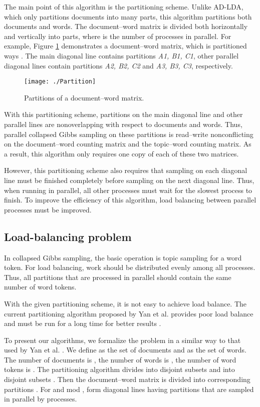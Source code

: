 \documentclass[10pt,conference]{IEEEtran}
\begin{document}
The main point of this algorithm is the partitioning scheme. Unlike AD-LDA, which only partitions documents into many parts, this algorithm partitions both documents and words. The document--word matrix is divided both horizontally and vertically into  parts, where  is the number of processes in parallel. For example, Figure \ref{fig:Partition} demonstrates a document--word matrix, which is partitioned  ways \cite{ihler2012understanding}. The main diagonal line contains partitions \textit{A1, B1, C1}, other parallel diagonal lines contain partitions \textit{A2, B2, C2} and \textit{A3, B3, C3}, respectively.
\begin{figure}[h]
\centering
\texttt{[image: ./Partition]}
\caption{Partitions of a document--word matrix.}
\label{fig:Partition}
\end{figure}

With this partitioning scheme, partitions on the main diagonal line and other parallel lines are nonoverlapping with respect to documents and words. Thus, parallel collapsed Gibbs sampling on these partitions is read--write nonconflicting on the document--word counting matrix and the topic--word counting matrix. As a result, this algorithm only requires one copy of each of these two matrices.

However, this partitioning scheme also requires that sampling on each diagonal line must be finished completely before sampling on the next diagonal line. Thus, when running in parallel, all other processes must wait for the slowest process to finish. To improve the efficiency of this algorithm, load balancing between parallel processes must be improved.

\subsection{Load-balancing problem}
\label{subsecteta}
In collapsed Gibbs sampling, the basic operation is topic sampling for a word token. For load balancing, work should be distributed evenly among all processes. Thus, all partitions that are processed in parallel should contain the same number of word tokens.

With the given partitioning scheme, it is not easy to achieve load balance. The current partitioning algorithm proposed by Yan et al. provides poor load balance and must be run for a long time for better results \cite{yan2009parallel}.

To present our algorithms, we formalize the problem in a similar way to that used by Yan et al. \cite{yan2009parallel}. We define  as the set of documents and  as the set of words. The number of documents is , the number of words is , the number of word tokens is . The partitioning algorithm divides  into  disjoint subsets  and  into  disjoint subsets . Then the document--word matrix  is divided into  corresponding partitions . For  and  mod ,  form diagonal lines having partitions that are sampled in parallel by  processes.
\end{document}
